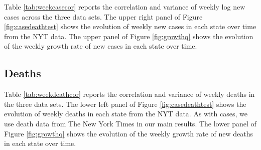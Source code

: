 \documentclass[3p, longtitle]{elsarticle}
\theoremstyle{definition}
\begin{document}
Table \ref{tab:weekcasecor} reports the correlation and variance of
weekly log new cases across the three data sets. The upper right panel of Figure
\ref{fig:casedeathtest} shows the evolution of weekly new cases in each
state over time  from the NYT data. The upper panel of Figure \ref{fig:growthq} shows the evolution of the weekly growth rate of new cases in each
state over time.




\subsection{Deaths}

Table \ref{tab:weekdeathcor} reports the correlation and variance of
weekly deaths in the three data sets. The lower left panel of Figure \ref{fig:casedeathtest}
shows the evolution of weekly deaths in each state from the NYT data. As with cases, we
use death data from The New York Times in our main results. The lower panel of Figure \ref{fig:growthq} shows the evolution of the weekly growth rate of new deaths in each
state over time.




\end{document}
